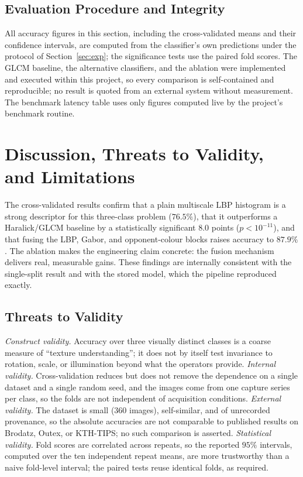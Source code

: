 \documentclass[conference]{IEEEtran}
\begin{document}
\subsection{Evaluation Procedure and Integrity}
All accuracy figures in this section, including the cross-validated means
and their confidence intervals, are computed from the classifier's own
predictions under the protocol of Section~\ref{sec:exp}; the significance
tests use the paired fold scores. The GLCM baseline, the alternative
classifiers, and the ablation were implemented and executed within this
project, so every comparison is self-contained and reproducible; no result
is quoted from an external system without measurement. The benchmark
latency table uses only figures computed live by the project's benchmark
routine.

\section{Discussion, Threats to Validity, and Limitations}\label{sec:disc}
The cross-validated results confirm that a plain multiscale LBP histogram is
a strong descriptor for this three-class problem ($76.5\%$), that it
outperforms a Haralick/GLCM baseline by a statistically significant
$8.0$ points ($p<10^{-11}$), and that fusing the LBP, Gabor, and
opponent-colour blocks raises accuracy to $87.9\%$. The ablation makes the
engineering claim concrete: the fusion mechanism delivers real, measurable
gains. These findings are internally consistent with the single-split
result and with the stored model, which the pipeline reproduced exactly.

\subsection{Threats to Validity}
\emph{Construct validity.} Accuracy over three visually distinct classes is
a coarse measure of ``texture understanding''; it does not by itself test
invariance to rotation, scale, or illumination beyond what the operators
provide. \emph{Internal validity.} Cross-validation reduces but does not
remove the dependence on a single dataset and a single random seed, and the
images come from one capture series per class, so the folds are not
independent of acquisition conditions. \emph{External validity.} The
dataset is small ($360$ images), self-similar, and of unrecorded provenance,
so the absolute accuracies are not comparable to published results on
Brodatz, Outex, or KTH-TIPS; no such comparison is asserted. \emph{Statistical
validity.} Fold scores are correlated across repeats, so the reported
$95\%$ intervals, computed over the ten independent repeat means, are more
trustworthy than a naive fold-level interval; the paired tests reuse
identical folds, as required.
\end{document}
